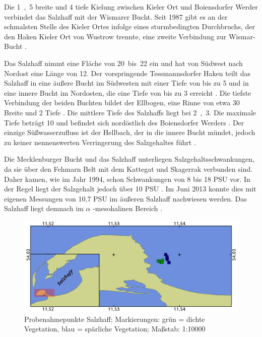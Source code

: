 Die \unit{1,5}{\kilo\metre} breite und \unit{4}{\metre} tiefe Kielung zwischen Kieler Ort und Boiensdorfer Werder verbindet das Salzhaff mit der Wismarer Bucht. Seit 1987 gibt es an der schmalsten Stelle des Kieler Ortes infolge eines sturmbedingten Durchbruchs, der den Haken Kieler Ort von Wustrow trennte, eine zweite Verbindung zur Wismar-Bucht \citep{kohn_1991}.

Das Salzhaff nimmt eine Fläche von \unit{20 bis 22}{\kilo\metre\squared} ein und hat von Südwest nach Nordost eine Länge von \unit{12}{\kilo\metre}. Der vorspringende Tessmannsdorfer Haken teilt das Salzhaff in eine äußere Bucht im Südwesten mit einer Tiefe von bis zu \unit{5}{\metre} und in eine innere Bucht im Nordosten, die eine Tiefe von bis zu \unit{3}{\metre} erreicht \citep{weber_1997}. Die tiefste Verbindung der beiden Buchten bildet der Ellbogen, eine Rinne von etwa \unit{30}{\metre} Breite und \unit{2}{\metre} Tiefe \citep{kohn_1991}.
Die mittlere Tiefe des Salzhaffs liegt bei \unit{2,3}{\metre}. Die maximale Tiefe beträgt \unit{10}{\metre} und befindet sich nordöstlich des Boiensdorfer Werders \citep{kohn_1991}.
Der einzige Süßwasserzufluss ist der Hellbach, der in die innere Bucht mündet, jedoch zu keiner nennenswerten Verringerung des Salzgehaltes führt \citep{weber_1997}. 

Die Mecklenburger Bucht und das Salzhaff unterliegen Salzgehaltsschwankungen, da sie über den Fehmarn Belt mit dem Kattegat und Skagerrak verbunden sind. Daher kamen, wie im Jahr 1994, schon Schwankungen von 8 bis 18 PSU vor. In der Regel liegt der Salzgehalt jedoch über 10 PSU \citep{weber_1997}. Im Juni 2013 konnte dies mit eigenen Messungen von 10,7 PSU im äußeren Salzhaff nachwiesen werden. Das Salzhaff liegt demnach im $ \alpha$ -mesohalinen Bereich \citep{gosselck_2011}. 




\begin{figure}[htb]
\centering
\includegraphics[width=1\textwidth]{images/SH.png}
\caption[Probenahmepunkte Salzhaff]{Probenahmepunkte Salzhaff; Markierungen: grün = dichte Vegetation, blau = spärliche Vegetation; Maßstab: 1:10000}
\label{SH}
\end{figure}




